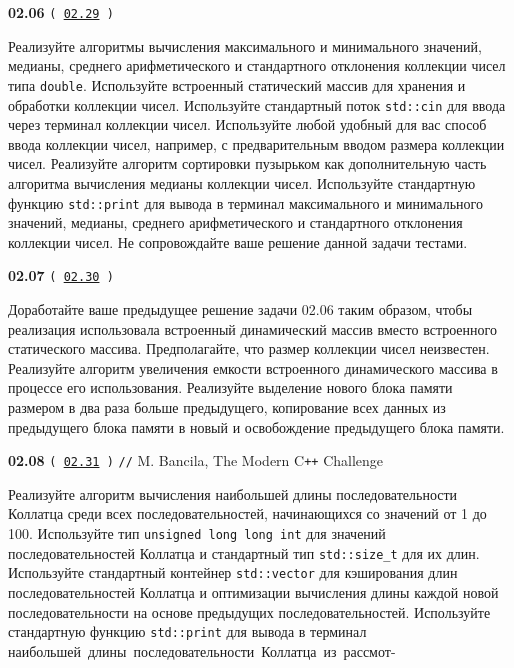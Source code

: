 \documentclass[a4paper,12pt]{article}
\begin{document}
\bigskip

{\large \textbf{02.06} \texttt{(\,\href{https://github.com/i-s-m-mipt/Education/blob/master/projects/examples/source/02.29.cpp}{02.29}\,)}}

\bigskip

Реализуйте алгоритмы вычисления максимального и минимального значений, медианы, среднего арифметического и стандартного отклонения коллекции чисел типа \lstinline{double}. Используйте встроенный статический массив для хранения и обработки коллекции чисел. Используйте стандартный поток \lstinline{std::cin} для ввода через терминал коллекции чисел. Используйте любой удобный для вас способ ввода коллекции чисел, например, с предварительным вводом размера коллекции чисел. Реализуйте алгоритм сортировки пузырьком как дополнительную часть алгоритма вычисления медианы коллекции чисел. Используйте стандартную функцию \lstinline{std::print} для вывода в терминал максимального и минимального значений, медианы, среднего арифметического и стандартного отклонения коллекции чисел. Не сопровождайте ваше решение данной задачи тестами.

\bigskip

{\large \textbf{02.07} \texttt{(\,\href{https://github.com/i-s-m-mipt/Education/blob/master/projects/examples/source/02.30.cpp}{02.30}\,)}}

\bigskip

Доработайте ваше предыдущее решение задачи 02.06 таким образом, чтобы реализация использовала встроенный динамический массив вместо встроенного статического массива. Предполагайте, что размер коллекции чисел неизвестен. Реализуйте алгоритм увеличения емкости встроенного динамического массива в процессе его использования. Реализуйте выделение нового блока памяти размером в два раза больше предыдущего, копирование всех данных из предыдущего блока памяти в новый и освобождение предыдущего блока памяти.

\bigskip

{\large \textbf{02.08} \texttt{(\,\href{https://github.com/i-s-m-mipt/Education/blob/master/projects/examples/source/02.31.cpp}{02.31}\,)} \texttt{//} M. Bancila, The Modern C\texttt{++} Challenge}

\bigskip

Реализуйте алгоритм вычисления наибольшей длины последовательности Коллатца среди всех последовательностей, начинающихся со значений от 1 до 100. Используйте тип \lstinline{unsigned long long int} для значений последовательностей Коллатца и стандартный тип \lstinline{std::size_t} для их длин. Используйте стандартный контейнер \lstinline{std::vector} для кэширования длин последовательностей Коллатца и оптимизации вычисления длины каждой новой последовательности на основе предыдущих последовательностей. Используйте стандартную функцию \lstinline{std::print} для вывода в терминал наибольшей~длины~последовательности~Коллатца~из~рассмот- 
\end{document}
